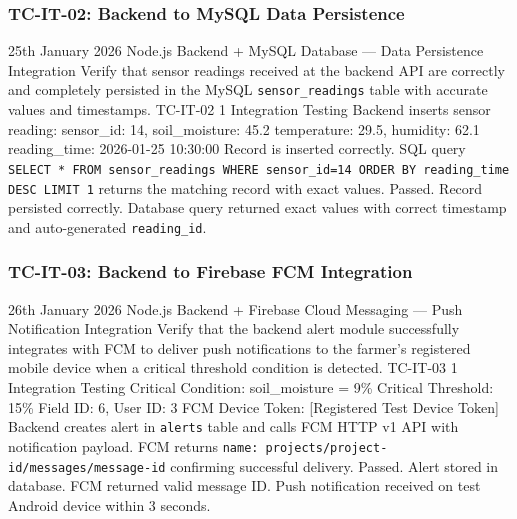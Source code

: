 \subsubsection{TC-IT-02: Backend to MySQL Data Persistence}

\testcase%
{25th January 2026}%
{Node.js Backend + MySQL Database --- Data Persistence
Integration}%
{Verify that sensor readings received at the backend API
are correctly and completely persisted in the MySQL
\texttt{sensor\_readings} table with accurate values and
timestamps.}%
{TC-IT-02}%
{1}%
{Integration Testing}%
{Backend inserts sensor reading: \newline
sensor\_id: 14, soil\_moisture: 45.2 \newline
temperature: 29.5, humidity: 62.1 \newline
reading\_time: 2026-01-25 10:30:00}%
{Record is inserted correctly. SQL query
\texttt{SELECT * FROM sensor\_readings WHERE sensor\_id=14
ORDER BY reading\_time DESC LIMIT 1} returns the matching
record with exact values.}%
{Passed. Record persisted correctly. Database query
returned exact values with correct timestamp and
auto-generated \texttt{reading\_id}.}

\subsubsection{TC-IT-03: Backend to Firebase FCM Integration}

\testcase%
{26th January 2026}%
{Node.js Backend + Firebase Cloud Messaging --- Push
Notification Integration}%
{Verify that the backend alert module successfully
integrates with FCM to deliver push notifications to the
farmer's registered mobile device when a critical
threshold condition is detected.}%
{TC-IT-03}%
{1}%
{Integration Testing}%
{Critical Condition: soil\_moisture = 9\% \newline
Critical Threshold: 15\% \newline
Field ID: 6, User ID: 3 \newline
FCM Device Token: [Registered Test Device Token]}%
{Backend creates alert in \texttt{alerts} table and calls
FCM HTTP v1 API with notification payload. FCM returns
\texttt{name: projects/project-id/messages/message-id}
confirming successful delivery.}%
{Passed. Alert stored in database. FCM returned valid
message ID. Push notification received on test Android
device within 3 seconds.}

